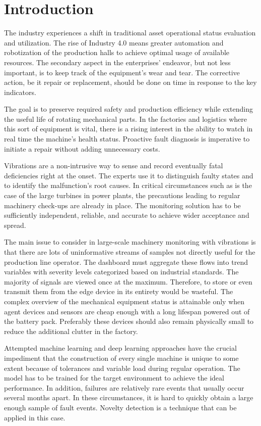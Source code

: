 \chapter{Introduction}
The industry experiences a shift in traditional asset operational status evaluation and utilization. The rise of Industry 4.0 means greater automation and robotization of the production halls to achieve optimal usage of available resources. The secondary aspect in the enterprises' endeavor, but not less important, is to keep track of the equipment's wear and tear. The corrective action, be it repair or replacement, should be done on time in response to the key indicators.

The goal is to preserve required safety and production efficiency while extending the useful life of rotating mechanical parts. In the factories and logistics where this sort of equipment is vital, there is a rising interest in the ability to watch in real time the machine's health status. Proactive fault diagnosis is imperative to initiate a repair without adding unnecessary costs.

Vibrations are a non-intrusive way to sense and record eventually fatal deficiencies right at the onset. The experts use it to distinguish faulty states and to identify the malfunction's root causes. In critical circumstances such as is the case of the large turbines in power plants, the precautions leading to regular machinery check-ups are already in place. The monitoring solution has to be sufficiently independent, reliable, and accurate to achieve wider acceptance and spread.

The main issue to consider in large-scale machinery monitoring with vibrations is that there are lots of uninformative streams of samples not directly useful for the production line operator. The dashboard must aggregate these flows into trend variables with severity levels categorized based on industrial standards. The majority of signals are viewed once at the maximum. Therefore, to store or even transmit them from the edge device in its entirety would be wasteful. The complex overview of the mechanical equipment status is attainable only when agent devices and sensors are cheap enough with a long lifespan powered out of the battery pack. Preferably these devices should also remain physically small to reduce the additional clutter in the factory.

Attempted machine learning and deep learning approaches have the crucial impediment that the construction of every single machine is unique to some extent because of tolerances and variable load during regular operation. The model has to be trained for the target environment to achieve the ideal performance. In addition, failures are relatively rare events that usually occur several months apart. In these circumstances, it is hard to quickly obtain a large enough sample of fault events. Novelty detection is a technique that can be applied in this case.

